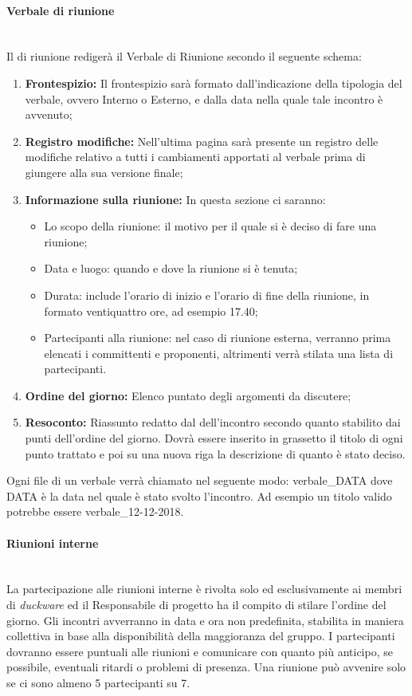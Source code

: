 \paragraph{Verbale di riunione}\mbox{}\\[0.4cm]
Il  di riunione redigerà il Verbale di Riunione secondo il seguente schema:
\begin{enumerate}
    \item \textbf{Frontespizio: }Il frontespizio sarà formato dall’indicazione della tipologia del verbale, ovvero Interno o Esterno, e dalla data nella quale tale incontro è avvenuto;
    \item \textbf{Registro modifiche: }Nell'ultima pagina sarà presente un registro delle modifiche relativo a tutti i cambiamenti apportati al verbale prima di giungere alla sua versione finale;
    \item \textbf{Informazione sulla riunione: }In questa sezione ci saranno:
    \begin{itemize}
        \item Lo scopo della riunione: il motivo per il quale si è deciso di fare una riunione;
        \item Data e luogo: quando e dove la riunione si è tenuta;
        \item Durata: include l’orario di inizio e l’orario di fine della riunione, in formato ventiquattro ore, ad esempio 17.40;
        \item Partecipanti alla riunione: nel caso di riunione esterna, verranno prima elencati i committenti e proponenti, altrimenti verrà stilata una lista di partecipanti.
    \end{itemize}
    \item \textbf{Ordine del giorno: }Elenco puntato degli argomenti da discutere;
    \item \textbf{Resoconto: }Riassunto redatto dal  dell’incontro secondo quanto stabilito dai punti dell'ordine del giorno. Dovrà essere inserito in grassetto il titolo di ogni punto trattato e poi su una nuova riga la descrizione di quanto è stato deciso.
\end{enumerate}
Ogni file di un verbale verrà chiamato nel seguente modo: verbale\_{}DATA dove DATA è la data nel quale è stato svolto l'incontro. Ad esempio un titolo valido potrebbe essere verbale\_{}12-12-2018.

\paragraph{Riunioni interne}\mbox{}\\[0.4cm]
La partecipazione alle riunioni interne è rivolta solo ed esclusivamente ai membri di \emph{duckware} ed il Responsabile di progetto ha il compito di stilare l’ordine del giorno. Gli incontri avverranno in data e ora non predefinita, stabilita in maniera collettiva in base alla disponibilità della maggioranza del gruppo. I partecipanti dovranno essere puntuali alle riunioni e comunicare con quanto più anticipo, se possibile, eventuali ritardi o problemi di presenza. Una riunione può avvenire solo se ci sono almeno 5 partecipanti su 7.

